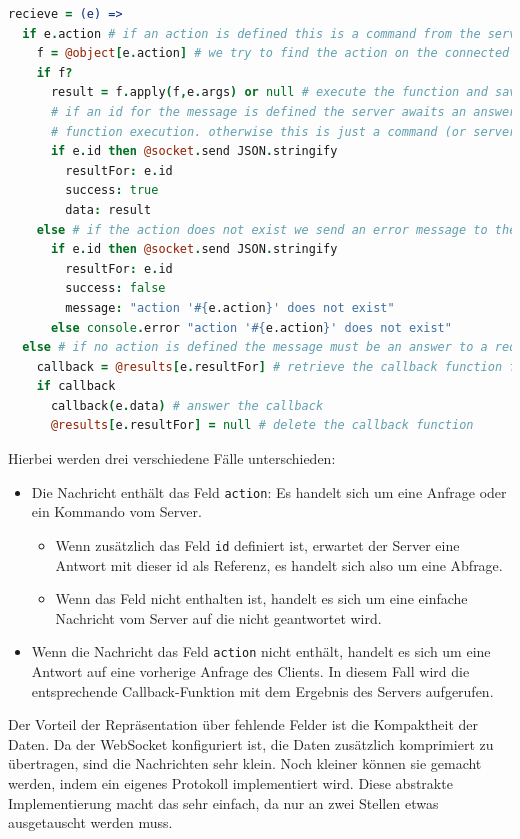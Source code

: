 \begin{lstlisting}[language=coffee]
recieve = (e) =>  
  if e.action # if an action is defined this is a command from the server
    f = @object[e.action] # we try to find the action on the connected object
    if f?
      result = f.apply(f,e.args) or null # execute the function and save the result
      # if an id for the message is defined the server awaits an answer with the result of the
      # function execution. otherwise this is just a command (or server-push)
      if e.id then @socket.send JSON.stringify 
        resultFor: e.id
        success: true
        data: result
    else # if the action does not exist we send an error message to the server
      if e.id then @socket.send JSON.stringify
        resultFor: e.id
        success: false
        message: "action '#{e.action}' does not exist"
      else console.error "action '#{e.action}' does not exist"
  else # if no action is defined the message must be an answer to a request
    callback = @results[e.resultFor] # retrieve the callback function for this action
    if callback 
      callback(e.data) # answer the callback
      @results[e.resultFor] = null # delete the callback function
\end{lstlisting}

Hierbei werden drei verschiedene Fälle unterschieden:

\begin{itemize}  
  \item Die Nachricht enthält das Feld \texttt{action}: Es handelt sich um eine
Anfrage oder ein Kommando vom Server.
  \begin{itemize}
    \item Wenn zusätzlich das Feld \texttt{id} definiert ist, erwartet der Server eine Antwort mit 
    dieser id als Referenz, es handelt sich also um eine Abfrage.
    \item Wenn das Feld nicht enthalten ist, handelt es sich um eine einfache Nachricht vom Server
    auf die nicht geantwortet wird.
  \end{itemize}
  \item Wenn die Nachricht das Feld \texttt{action} nicht enthält, handelt es sich um eine Antwort 
  auf eine vorherige Anfrage des Clients. In diesem Fall wird die entsprechende Callback-Funktion mit
  dem Ergebnis des Servers aufgerufen.
\end{itemize}

Der Vorteil der Repräsentation über fehlende Felder ist die Kompaktheit der Daten. Da der WebSocket
konfiguriert ist, die Daten zusätzlich komprimiert zu übertragen, sind die Nachrichten sehr klein.
Noch kleiner können sie gemacht werden, indem ein eigenes Protokoll implementiert wird. Diese
abstrakte Implementierung macht das sehr einfach, da nur an zwei Stellen etwas ausgetauscht werden
muss.

